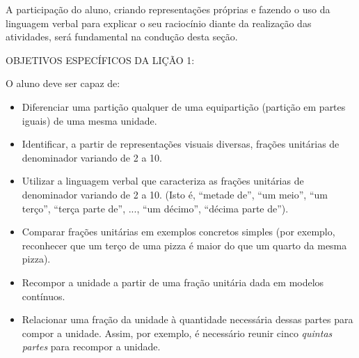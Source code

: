 A participação do aluno, criando representações próprias e fazendo o uso da linguagem verbal para explicar o seu raciocínio diante da realização das atividades, será fundamental na condução desta seção.
\vspace{.15cm}

\noindent OBJETIVOS ESPECÍFICOS DA LIÇÃO 1:
\vspace{.15cm}

\noindent O aluno deve ser capaz de:
\begin{itemize}
  \item  Diferenciar uma partição qualquer de uma equipartição (partição em partes iguais) de uma mesma unidade.
  \item  Identificar, a partir de representações visuais diversas, frações unitárias de denominador variando de 2 a 10. 
  \item  Utilizar a linguagem verbal que caracteriza as frações unitárias de denominador variando de 2 a 10. (Isto é, ``metade de'', ``um meio'', ``um terço'', ``terça parte de'', ..., ``um décimo'', ``décima parte de'').
  \item  Comparar frações unitárias em exemplos concretos simples (por exemplo, reconhecer que um terço de uma pizza é maior do que um quarto da mesma pizza).
  \item  Recompor a unidade a partir de uma fração unitária dada em modelos contínuos. 
  \item  Relacionar uma fração da unidade à quantidade necessária dessas partes para compor a unidade. Assim, por exemplo, é necessário reunir cinco {\it quintas partes} para recompor a unidade.  
\end{itemize}

